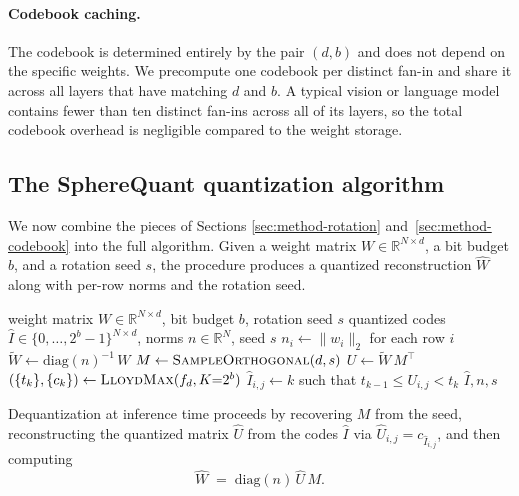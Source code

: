 \paragraph{Codebook caching.}
The codebook is determined entirely by the pair $(d, b)$ and does not depend
on the specific weights. We precompute one codebook per distinct fan-in and
share it across all layers that have matching $d$ and $b$. A typical vision
or language model contains fewer than ten distinct fan-ins across all of
its layers, so the total codebook overhead is negligible compared to the
weight storage.

\subsection{The SphereQuant quantization algorithm}
\label{sec:method-pipeline}

We now combine the pieces of Sections \ref{sec:method-rotation}
and~\ref{sec:method-codebook} into the full algorithm. Given a weight
matrix $W \in \mathbb{R}^{N \times d}$, a bit budget $b$, and a rotation
seed $s$, the procedure produces a quantized reconstruction $\widehat{W}$
along with per-row norms and the rotation seed.

\begin{algorithm}[t]
\caption{SphereQuant post-training weight quantization, applied per layer.}
\label{alg:spherequant}
\begin{algorithmic}[1]
\Require weight matrix $W \in \mathbb{R}^{N \times d}$, bit budget $b$,
         rotation seed $s$
\Ensure  quantized codes $\widehat{I} \in \{0, \ldots, 2^b-1\}^{N \times d}$,
         norms $n \in \mathbb{R}^N$, seed $s$
\State $n_i \gets \|w_i\|_2$ for each row $i$
\State $\widetilde{W} \gets \mathrm{diag}(n)^{-1}\, W$
\State $M \gets \textsc{SampleOrthogonal}(d, s)$
\State $U \gets \widetilde{W}\, M^\top$
\State $(\{t_k\}, \{c_k\}) \gets \textsc{LloydMax}(f_d, K{=}2^b)$
  \State $\widehat{I}_{i,j} \gets k$ such that $t_{k-1} \leq U_{i,j} < t_k$
\EndFor
\State \Return $\widehat{I}, n, s$
\end{algorithmic}
\end{algorithm}

Dequantization at inference time proceeds by recovering $M$ from the seed,
reconstructing the quantized matrix $\widehat{U}$ from the codes
$\widehat{I}$ via $\widehat{U}_{i,j} = c_{\widehat{I}_{i,j}}$, and then
computing
\begin{equation}
\widehat{W}
  \;=\; \mathrm{diag}(n)\, \widehat{U}\, M.
\label{eq:dequant}
\end{equation}

